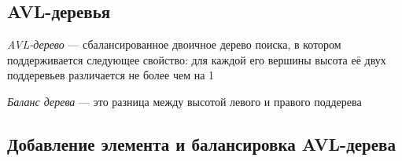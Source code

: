 \documentclass[a4paper]{article}
\begin{document}

\subsection{AVL-деревья}
 \textit{AVL-дерево} — сбалансированное двоичное дерево поиска, в котором поддерживается следующее свойство: для каждой его вершины высота её двух поддеревьев различается не более чем на 1

 \textit{Баланс дерева} — это разница между высотой левого и правого поддерева

\subsection{Добавление элемента и балансировка AVL-дерева}
\end{document}
